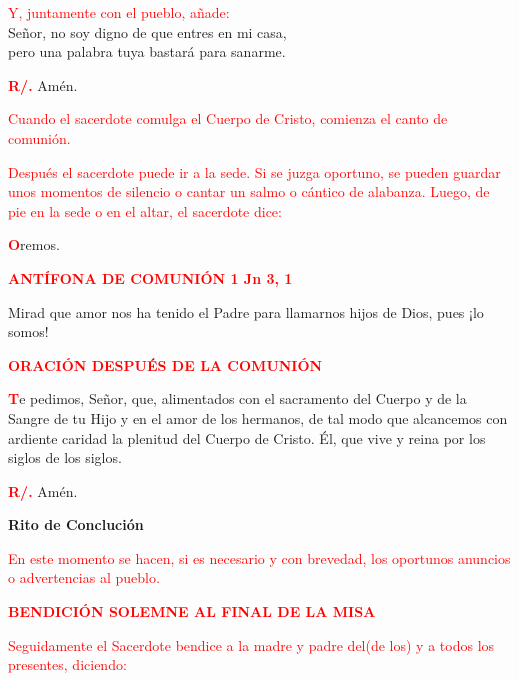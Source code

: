 \documentclass[12pt, letterpaper, spanish]{article}
\begin{document}
  \clearpage

  \large{\textcolor{red}{Y, juntamente con el pueblo, a\~nade:}}\\
  \Large Se\~nor, no soy digno de que entres en mi casa,\\ 
  pero una palabra tuya bastar\'a para sanarme.

  \noindent
  \Large {\bfseries \textcolor{red}{R/.}} \hspace{0.5cm} Am\'en.

  \large{\textcolor{red}{Cuando el sacerdote comulga el Cuerpo de Cristo, comienza el canto de comuni\'on.}}

  \large{\textcolor{red}{Despu\'es el sacerdote puede ir a la sede. Si se juzga oportuno, se pueden guardar unos momentos de silencio o cantar un salmo o c\'antico de alabanza. Luego, de pie en la sede o en el altar, el sacerdote dice:}}

  \noindent
  \lettrine[lines=1]{\bfseries \textcolor{red}{O}}{}\Large remos.

  \large {\bfseries \textcolor{red}{ANT\'IFONA DE COMUNI\'ON \hspace{1cm} 1 Jn 3, 1}}

  \noindent
  \Large Mirad que amor nos ha tenido el Padre para llamarnos hijos de Dios, pues ¡lo somos!

  \large {\bfseries \textcolor{red}{ORACI\'ON DESPU\'ES DE LA COMUNI\'ON}}

  \lettrine[lines=2]{\bfseries \textcolor{red}{T}}{}\Large e pedimos, Señor, que, alimentados con el sacramento del Cuerpo y de la Sangre de tu Hijo y en el amor de los hermanos, de tal modo que alcancemos con ardiente caridad la plenitud del Cuerpo de Cristo. Él, que vive y reina por los siglos de los siglos.

  \noindent
  \Large {\bfseries \textcolor{red}{R/.}} \hspace{0.5cm} Am\'en.

  \clearpage

  \begin{center}
    \Huge {\bfseries Rito de Concluci\'on}
  \end{center}

  \large{\textcolor{red}{En este momento se hacen, si es necesario y con brevedad, los oportunos anuncios o advertencias al pueblo.}}

  \Large {\bfseries \textcolor{red}{BENDICI\'ON SOLEMNE AL FINAL DE LA MISA}}

  \large{\textcolor{red}{Seguidamente el Sacerdote bendice a la madre y padre del(de los) y a todos los presentes, diciendo:}}
  
\end{document}
